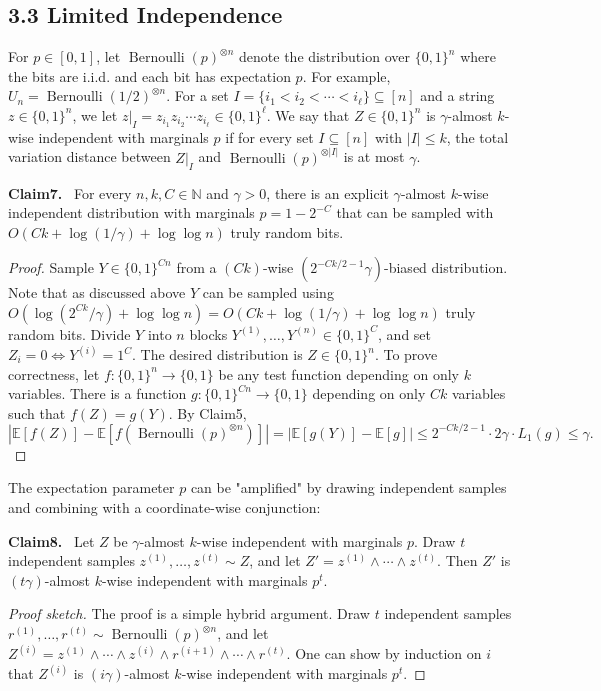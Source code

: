 \documentclass[10pt,a4paper]{article}
\newenvironment{authorclaim}[1]{\par\medskip\noindent\textbf{#1.}\ \ignorespaces}{\par\medskip}
\begin{document}
\subsection*{3.3 Limited Independence}
For $p\in[0,1]$, let $\operatorname{Bernoulli}(p)^{\otimes n}$ denote the distribution over $\{0,1\}^n$ where the bits are i.i.d. and each bit has expectation $p$. For example, $U_n=\operatorname{Bernoulli}(1/2)^{\otimes n}$. For a set $I=\{i_1<i_2<\cdots<i_\ell\}\subseteq[n]$ and a string $z\in\{0,1\}^n$, we let $z|_I=z_{i_1}z_{i_2}\cdots z_{i_\ell}\in\{0,1\}^\ell$. We say that $Z\in\{0,1\}^n$ is $\gamma$-almost $k$-wise independent with marginals $p$ if for every set $I\subseteq[n]$ with $|I|\le k$, the total variation distance between $Z|_I$ and $\operatorname{Bernoulli}(p)^{\otimes|I|}$ is at most $\gamma$.
\begin{authorclaim}{Claim7}
For every $n,k,C\in\mathbb N$ and $\gamma>0$, there is an explicit $\gamma$-almost $k$-wise independent distribution with marginals $p=1-2^{-C}$ that can be sampled with $O(Ck+\log(1/\gamma)+\log\log n)$ truly random bits.
\end{authorclaim}
\begin{proof}
Sample $Y\in\{0,1\}^{Cn}$ from a $(Ck)$-wise $(2^{-Ck/2-1}\gamma)$-biased distribution. Note that as discussed above $Y$ can be sampled using $O(\log(2^{Ck}/\gamma)+\log\log n)=O(Ck+\log(1/\gamma)+\log\log n)$ truly random bits. Divide $Y$ into $n$ blocks $Y^{(1)},\ldots,Y^{(n)}\in\{0,1\}^C$, and set $Z_i=0\Longleftrightarrow Y^{(i)}=1^C$. The desired distribution is $Z\in\{0,1\}^n$.
To prove correctness, let $f:\{0,1\}^n\to\{0,1\}$ be any test function depending on only $k$ variables. There is a function $g:\{0,1\}^{Cn}\to\{0,1\}$ depending on only $Ck$ variables such that $f(Z)=g(Y)$. By Claim5,
\[
|\mathbb E[f(Z)]-\mathbb E[f(\operatorname{Bernoulli}(p)^{\otimes n})]|
=|\mathbb E[g(Y)]-\mathbb E[g]|
\le2^{-Ck/2-1}\cdot2\gamma\cdot L_1(g)\le\gamma.
\]
\end{proof}
The expectation parameter $p$ can be "amplified" by drawing independent samples and combining with a coordinate-wise conjunction:
\begin{authorclaim}{Claim8}
Let $Z$ be $\gamma$-almost $k$-wise independent with marginals $p$. Draw $t$ independent samples $z^{(1)},\ldots,z^{(t)}\sim Z$, and let $Z'=z^{(1)}\wedge\cdots\wedge z^{(t)}$. Then $Z'$ is $(t\gamma)$-almost $k$-wise independent with marginals $p^t$.
\end{authorclaim}
\begin{proof}[Proof sketch]
The proof is a simple hybrid argument. Draw $t$ independent samples $r^{(1)},\ldots,r^{(t)}\sim\operatorname{Bernoulli}(p)^{\otimes n}$, and let $Z^{(i)}=z^{(1)}\wedge\cdots\wedge z^{(i)}\wedge r^{(i+1)}\wedge\cdots\wedge r^{(t)}$. One can show by induction on $i$ that $Z^{(i)}$ is $(i\gamma)$-almost $k$-wise independent with marginals $p^t$.
\end{proof}
\end{document}
